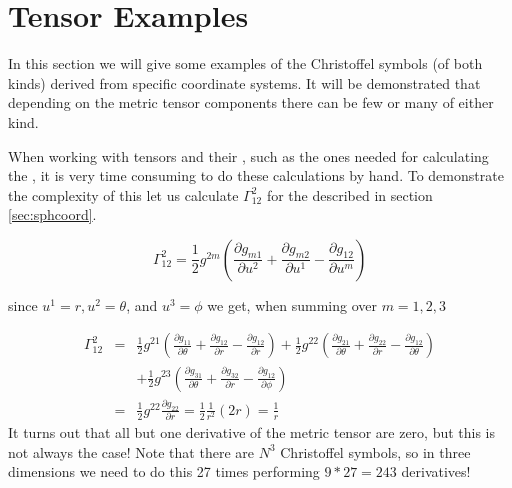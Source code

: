 \newcommand{\lcs}{\Gamma}
\newcommand{\mcs}[2]{\Gamma_{#1}^{#2}}

\chapter{Tensor Examples}
\label{sec:christoffel}

In this section we will give some examples of the Christoffel symbols (of 
both kinds) derived from specific coordinate systems. It will be demonstrated
that depending on the metric tensor components there can be few or many of either 
kind. 

When working with tensors and their , such as the ones 
needed for calculating the , it is very time 
consuming to do these calculations by hand. 
To demonstrate the complexity of this  let us 
calculate $\Gamma^2_{12}$ for the  described in section \ref{sec:sphcoord}.

$$
    \Gamma^2_{12} = \frac{1}{2} g^{2m} \left( \frac{\partial g_{m1}}{\partial u^2}  
                 +\frac{\partial g_{m2}}{\partial u^1}
                 -\frac{\partial g_{12}}{\partial u^m}
       \right)
$$

since $u^1=r, u^2=\theta$, and $u^3=\phi$ we get, when summing over $m=1,2,3$

$$
  \begin{array}{llllll}
    \Gamma^2_{12}  &= &\frac{1}{2} g^{21} \left( \frac{\partial g_{11}}{\partial \theta}  
                 +\frac{\partial g_{12}}{\partial r}
                 -\frac{\partial g_{12}}{\partial r} \right) +
                 \frac{1}{2} g^{22} \left( \frac{\partial g_{21}}{\partial \theta}  
                 +\frac{\partial g_{22}}{\partial r}
                 -\frac{\partial g_{12}}{\partial \theta} \right) \\ 
             &&+ 
                 \frac{1}{2} g^{23} \left( \frac{\partial g_{31}}{\partial \theta}  
                 +\frac{\partial g_{32}}{\partial r}
                 -\frac{\partial g_{12}}{\partial \phi} \right) \\
          & = &\frac{1}{2} g^{22}\frac{\partial g_{22}}{\partial r} = \frac{1}{2}\frac{1}{r^2}(2r) = \frac{1}{r}
  \end{array}
$$
It turns out that all but one derivative of the metric tensor are zero, but this is not
always the case! Note that there are $N^3$ Christoffel symbols, so in three dimensions we need to 
do this 27 times performing $9*27=243$ derivatives!


